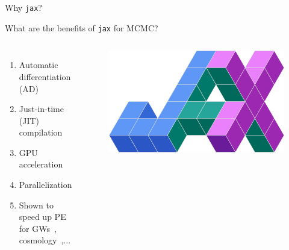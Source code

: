 \documentclass[usenames,dvipsnames,t]{beamer}
\begin{document}
  
  \begin{frame}{Why \texttt{jax}?}
  
    \def\x{4mm}
  
    \begin{tcolorbox}[colback=blue!10, boxrule=0pt]
      What are the benefits of \texttt{jax} for MCMC?
    \end{tcolorbox}
  
  
  \begin{columns}
    \begin{enumerate}
      \item Automatic differentiation (AD)
      
      \vspace{\x}
  
      \item Just-in-time (JIT) compilation
      
      \vspace{\x}
      
      \item GPU acceleration
      
      \vspace{\x}
      
      \item Parallelization
      
      \vspace{\x}
      
      \item Shown to speed up PE for GWs~\cite{wong2023fast}, cosmology~\cite{piras2023cosmopower},...
      
      
    \end{enumerate}
    \begin{figure}
      \includegraphics[width=\textwidth]{Figures/jax.png}
    \end{figure}
  \end{columns}
    
  \end{frame}
\end{document}
